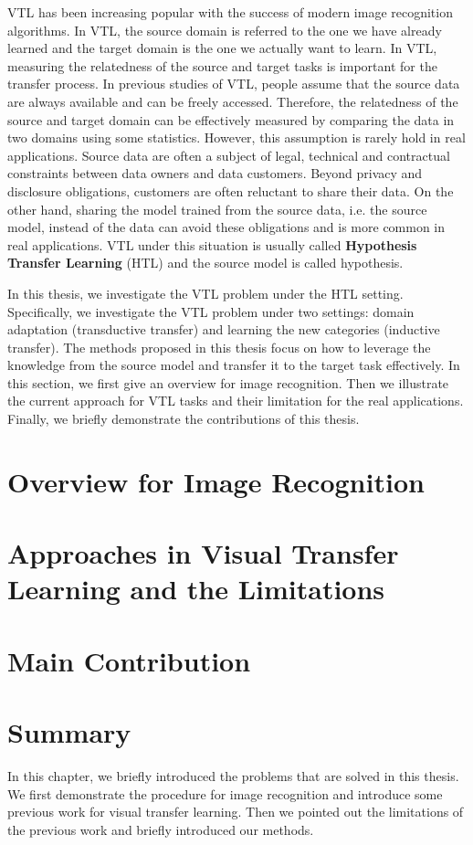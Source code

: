 VTL has been increasing popular with the success of modern image recognition algorithms. In VTL, the source domain is referred to the one we have already learned and the target domain is the one we actually want to learn. In VTL, measuring the relatedness of the source and target tasks is important for the transfer process.
In previous studies of VTL, people assume that the source data are always available and can be freely accessed. Therefore, the relatedness of the source and target domain can be effectively measured by comparing the data in two domains using some statistics. However, this assumption is rarely hold in real applications. Source data are often a subject of legal, technical and contractual constraints between data owners and data customers. Beyond privacy and disclosure obligations, customers are often reluctant to share their data. %
On the other hand, sharing the model trained from the source data, i.e. the source model, instead of the data can avoid these obligations and is more common in real applications. VTL under this situation is usually called \textbf{Hypothesis Transfer Learning} (HTL) \cite{kuzborskij2013stability} and the source model is called hypothesis.

In this thesis, we investigate the VTL problem under the HTL setting. Specifically, we investigate the VTL problem under two settings: domain adaptation (transductive transfer) and learning the new categories (inductive transfer). The methods proposed in this thesis focus on how to leverage the knowledge from the source model and transfer it to the target task effectively. In this section, we first give an overview for image recognition. Then we illustrate the current approach for VTL tasks and their limitation for the real applications. Finally, we briefly demonstrate the contributions of this thesis. 

\section{Overview for Image Recognition}\label{sec:intro:over}

\section{Approaches in Visual Transfer Learning and the Limitations}

\section{Main Contribution}

\section{Summary}
In this chapter, we briefly introduced the problems that are solved in this thesis. We first demonstrate the procedure for image recognition and introduce some previous work for visual transfer learning. Then we pointed out the limitations of the previous work and briefly introduced our methods.